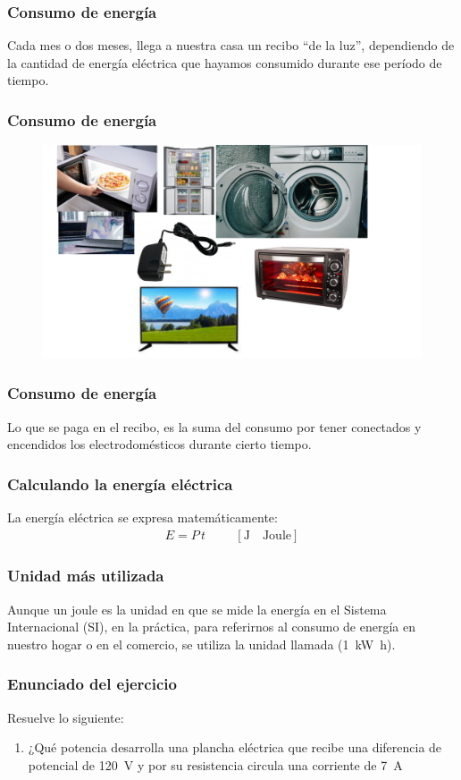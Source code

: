 \documentclass[14pt]{beamer}
\begin{document}
\begin{frame}
\frametitle{Consumo de energía}
Cada mes o dos meses, llega a nuestra casa un recibo \enquote{de la luz}, \pause dependiendo de la cantidad de energía eléctrica que hayamos consumido durante ese período de tiempo.
\end{frame}
\begin{frame}
\frametitle{Consumo de energía}
\begin{figure}
    \centering
    \includegraphics[scale=0.7]{Imagenes/Energia_Electrica_08.jpg}
\end{figure}
\end{frame}
\begin{frame}
\frametitle{Consumo de energía}
Lo que se paga en el recibo, es la suma del consumo por tener conectados y encendidos los electrodomésticos durante cierto tiempo.
\end{frame}
\begin{frame}
\frametitle{Calculando la energía eléctrica}
La energía eléctrica se expresa matemáticamente:
\pause
\begin{align*}
E = P \, t \hspace{1cm} \left[ \unit{\joule} \quad \text{Joule} \right]
\end{align*}
\end{frame}
\begin{frame}
\frametitle{Unidad más utilizada}
Aunque un joule es la unidad en que se mide la energía en el Sistema Internacional (SI), \pause en la práctica, para referirnos al consumo de energía en nuestro hogar o en el comercio, se utiliza la unidad llamada  (\SI{1}{\kilo\watt\hour}).
\end{frame}
\begin{frame}
\frametitle{Enunciado del ejercicio}
Resuelve lo siguiente:
\pause
{}
\begin{enumerate}[<+->]
\item ¿Qué potencia desarrolla una plancha eléctrica que recibe una diferencia de potencial de \SI{120}{\volt} y por su resistencia circula una corriente de \SI{7}{\ampere}
\seti
\end{enumerate}
\end{frame}
\end{document}
